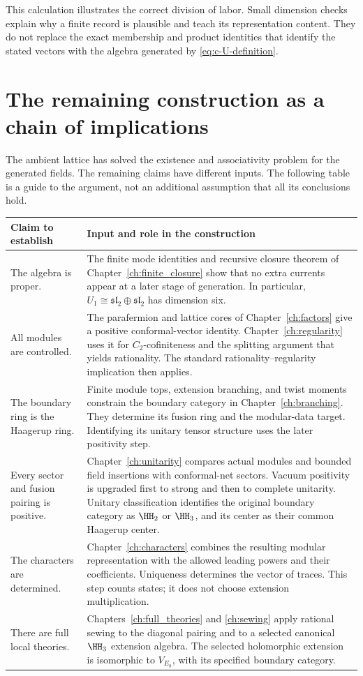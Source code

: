 This calculation illustrates the correct division of labor. Small
dimension checks explain why a finite record is plausible and teach
its representation content. They do not replace the exact membership
and product identities that identify the stated vectors with the
algebra generated by \eqref{eq:c-U-definition}.

\section{The remaining construction as a chain of implications}

The ambient lattice has solved the existence and associativity
problem for the generated fields. The remaining claims have
different inputs. The following table is a guide to the argument,
not an additional assumption that all its conclusions hold.

\begin{longtable}{@{}>{\raggedright\arraybackslash}p{}p{}@{}}
\toprule
Claim to establish & Input and role in the construction\\
\midrule
\endhead
The algebra is proper. &
The finite mode identities and recursive closure theorem of
Chapter~\ref{ch:finite_closure} show that no extra currents
appear at a later stage of generation. In particular,
$U_1\cong\mathfrak{sl}_2\oplus\mathfrak{sl}_2$ has dimension six.\\[5pt]
All modules are controlled. &
The parafermion and lattice cores of Chapter~\ref{ch:factors}
give a positive conformal-vector identity.
Chapter~\ref{ch:regularity} uses it for $C_2$-cofiniteness and
the splitting argument that yields rationality.
The standard rationality--regularity implication then applies.\\[5pt]
The boundary ring is the Haagerup ring. &
Finite module tops, extension branching, and twist moments
constrain the boundary category in Chapter~\ref{ch:branching}.
They determine its fusion ring and the modular-data target.
Identifying its unitary tensor structure uses the later
positivity step.\\[5pt]
Every sector and fusion pairing is positive. &
Chapter~\ref{ch:unitarity} compares actual modules and bounded
field insertions with conformal-net sectors. Vacuum positivity
is upgraded first to strong and then to complete unitarity.
Unitary classification identifies the original boundary category
as $\HH_2$ or $\HH_3$, and its center as their common
Haagerup center.\\[5pt]
The characters are determined. &
Chapter~\ref{ch:characters} combines the resulting modular
representation with the allowed leading powers and their
coefficients. Uniqueness determines the vector of traces.
This step counts states; it does not choose extension
multiplication.\\[5pt]
There are full local theories. &
Chapters~\ref{ch:full_theories} and \ref{ch:sewing} apply rational
sewing to the diagonal pairing and to a selected canonical
$\HH_3$ extension algebra. The selected holomorphic extension
is isomorphic to $V_{E_8}$, with its specified boundary category.\\
\bottomrule
\end{longtable}

